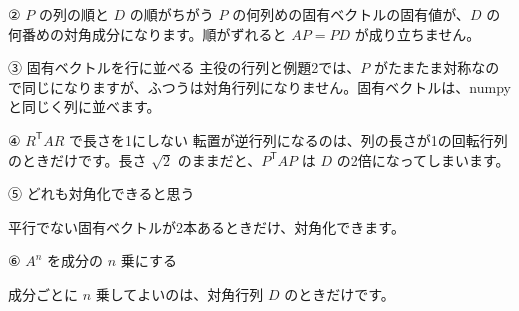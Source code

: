 \begin{tsumazuki}{② $P$ の列の順と $D$ の順がちがう}
$P$ の何列めの固有ベクトルの固有値が、$D$ の何番めの対角成分になります。順がずれると $AP=PD$ が成り立ちません。
\end{tsumazuki}

\begin{tsumazuki}{③ 固有ベクトルを行に並べる}
主役の行列と例題2では、$P$ がたまたま対称なので同じになりますが、ふつうは対角行列になりません。固有ベクトルは、numpy と同じく列に並べます。
\end{tsumazuki}

\begin{tsumazuki}{④ $R^{\mathsf T}AR$ で長さを1にしない}
転置が逆行列になるのは、列の長さが1の回転行列のときだけです。長さ $\sqrt2$ のままだと、$P^{\mathsf T}AP$ は $D$ の2倍になってしまいます。
\end{tsumazuki}

\begingroup{}%
\noindent\begin{minipage}[t]{0.485\linewidth}\vspace{0pt}
\begin{tsumazuki}{⑤ どれも対角化できると思う}
\raggedright{}
平行でない固有ベクトルが2本あるときだけ、対角化できます。
\end{tsumazuki}
\end{minipage}\hfill
\begin{minipage}[t]{0.485\linewidth}\vspace{0pt}
\begin{tsumazuki}{⑥ $A^n$ を成分の $n$ 乗にする}
\raggedright{}
成分ごとに $n$ 乗してよいのは、対角行列 $D$ のときだけです。
\end{tsumazuki}
\end{minipage}\par
\endgroup



